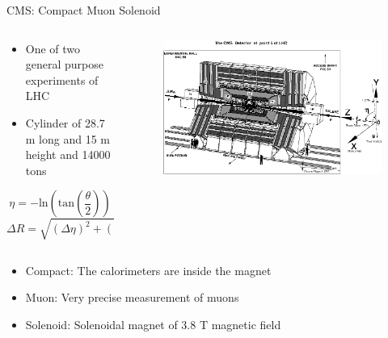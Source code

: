 \begin{frame}{CMS: Compact Muon Solenoid}
\vspace{-.2cm}

\begin{columns}
\begin{column}{.30\textwidth}
\begin{block}{}
\begin{itemize}\scriptsize
\item One of two general purpose experiments of LHC
\item Cylinder of 28.7 m long and 15 m height and 14000 tons
\end{itemize}
\tiny{
\begin{equation*}  
\eta = -\text{ln}\left( \text{tan}\left(\frac{\theta}{2}\right)\right)
\end{equation*}
\begin{equation*}
\Delta R=\sqrt{(\Delta\eta)^{2}+(\Delta\phi)^{2}}
\end{equation*}
}%
\end{block}
\end{column}

\begin{column}{.70\textwidth}
\begin{figure}[!Hhtbp]
  \begin{center}
    \includegraphics[width=\textwidth]{../figs/CMS_coordinates.jpg}
  \end{center}
\end{figure}
\end{column}
\end{columns}

\vspace{-.2cm}
\begin{block}{}
\begin{itemize}\scriptsize
\item Compact: The calorimeters are inside the magnet
\item Muon: Very precise measurement of muons
\item Solenoid: Solenoidal magnet of 3.8 T magnetic field
\end{itemize}
\end{block}

\end{frame}



